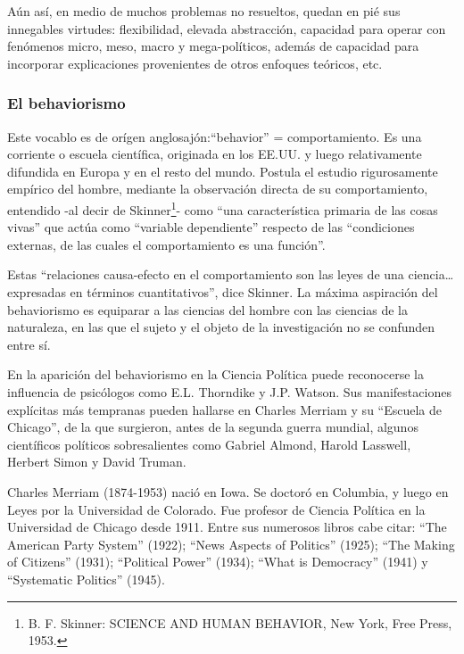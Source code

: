 \documentclass[
]{book}
\begin{document}
Aún así, en medio de muchos problemas no resueltos, quedan en pié sus innegables virtudes: flexibilidad, elevada abstracción, capacidad para operar con fenómenos micro, meso, macro y mega-políticos, además de capacidad para incorporar explicaciones provenientes de otros enfoques teóricos, etc.

\hypertarget{el-behaviorismo}{%
\subsubsection*{El behaviorismo}\label{el-behaviorismo}}

Este vocablo es de orígen anglosajón:``behavior'' = comportamiento. Es una corriente o escuela científica, originada en los EE.UU. y luego relativamente difundida en Europa y en el resto del mundo. Postula el estudio rigurosamente empírico del hombre, mediante la observación directa de su comportamiento, entendido -al decir de Skinner\footnote{B. F. Skinner: SCIENCE AND HUMAN BEHAVIOR, New York, Free Press, 1953.}- como ``una característica primaria de las cosas vivas'' que actúa como ``variable dependiente'' respecto de las ``condiciones externas, de las cuales el comportamiento es una función''.

Estas ``relaciones causa-efecto en el comportamiento son las leyes de una ciencia\ldots expresadas en términos cuantitativos'', dice Skinner. La máxima aspiración del behaviorismo es equiparar a las ciencias del hombre con las ciencias de la naturaleza, en las que el sujeto y el objeto de la investigación no se confunden entre sí.

En la aparición del behaviorismo en la Ciencia Política puede reconocerse la influencia de psicólogos como E.L. Thorndike y J.P. Watson. Sus manifestaciones explícitas más tempranas pueden hallarse en Charles Merriam y su ``Escuela de Chicago'', de la que surgieron, antes de la segunda guerra mundial, algunos científicos políticos sobresalientes como Gabriel Almond, Harold Lasswell, Herbert Simon y David Truman.

Charles Merriam (1874-1953) nació en Iowa. Se doctoró en Columbia, y luego en Leyes por la Universidad de Colorado. Fue profesor de Ciencia Política en la Universidad de Chicago desde 1911. Entre sus numerosos libros cabe citar: ``The American Party System'' (1922); ``News Aspects of Politics'' (1925); ``The Making of Citizens'' (1931); ``Political Power'' (1934); ``What is Democracy'' (1941) y ``Systematic Politics'' (1945).
\end{document}
